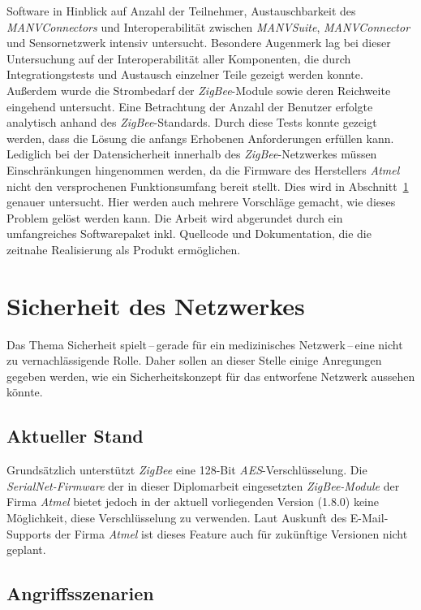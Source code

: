 Software in Hinblick auf Anzahl der Teilnehmer, Austauschbarkeit des \emph{MANVConnectors} und Interoperabilität
zwischen \emph{MANVSuite}, \emph{MANVConnector} und Sensornetzwerk intensiv untersucht. 
Besondere Augenmerk lag bei dieser Untersuchung auf der Interoperabilität aller Komponenten, die durch 
Integrationgstests und Austausch einzelner Teile gezeigt werden konnte. Außerdem wurde die Strombedarf der 
\emph{ZigBee}-Module sowie deren Reichweite eingehend untersucht. Eine Betrachtung der Anzahl der Benutzer
erfolgte analytisch anhand des \emph{ZigBee}-Standards. Durch diese Tests konnte gezeigt werden, dass die
Lösung die anfangs Erhobenen Anforderungen erfüllen kann.  
Lediglich bei der Datensicherheit innerhalb des \emph{ZigBee}-Netzwerkes müssen 
Einschränkungen hingenommen werden, da die Firmware des Herstellers \emph{Atmel} nicht den versprochenen
Funktionsumfang bereit stellt. Dies wird in Abschnitt~\ref{Sicherheit} genauer untersucht. Hier werden
auch mehrere Vorschläge gemacht, wie dieses Problem gelöst werden kann. Die Arbeit wird abgerundet durch ein
umfangreiches Softwarepaket inkl. Quellcode und Dokumentation, die die zeitnahe Realisierung als Produkt ermöglichen.

\section{Sicherheit des Netzwerkes}
\label{Sicherheit}
Das Thema Sicherheit spielt\,--\,gerade für ein medizinisches Netzwerk\,--\,eine nicht zu vernachlässigende Rolle.
Daher sollen an dieser Stelle einige Anregungen gegeben werden, wie ein Sicherheitskonzept für das entworfene Netzwerk 
aussehen könnte.

\subsection{Aktueller Stand}
Grundsätzlich unterstützt \emph{ZigBee} eine 128-Bit \emph{AES}-Verschlüsselung. Die \emph{SerialNet-Firmware} der in 
dieser Diplomarbeit eingesetzten \emph{ZigBee-Module} der Firma \emph{Atmel} bietet jedoch in der aktuell vorliegenden 
Version (1.8.0) keine Möglichkeit, diese Verschlüsselung zu verwenden. Laut Auskunft des E-Mail-Supports der Firma 
\emph{Atmel} ist dieses Feature auch für zukünftige Versionen nicht geplant.\\
\subsection{Angriffsszenarien}

